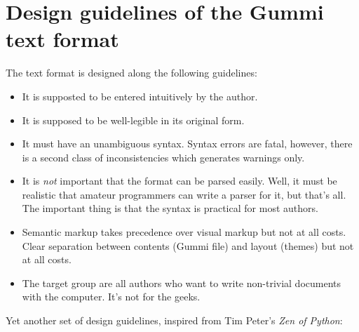 \documentclass[12pt,openany]{book}
\begin{document}
\section{Design guidelines of the Gummi text format}

The text format is designed along the following guidelines:

\begin{itemize}
\item It is supposted to be entered intuitively by the author.
\item It is supposed to be well-legible in its original form.
\item It must have an unambiguous syntax.  Syntax errors are fatal, however,
  there is a second class of inconsistencies which generates warnings only.
\item It is \emph{not} important that the format can be parsed easily.  Well,
  it must be realistic that amateur programmers can write a parser for it, but
  that's all.  The important thing is that the syntax is practical for most
  authors.
\item Semantic markup takes precedence over visual markup but not at all costs.
  Clear separation between contents (Gummi file) and layout (themes) but not at
  all costs.
\item The target group are all authors who want to write non-trivial documents
  with the computer.  It's not for the geeks.
\end{itemize}

Yet another set of design guidelines, inspired from Tim Peter's \emph{Zen of Python}:
\end{document}
